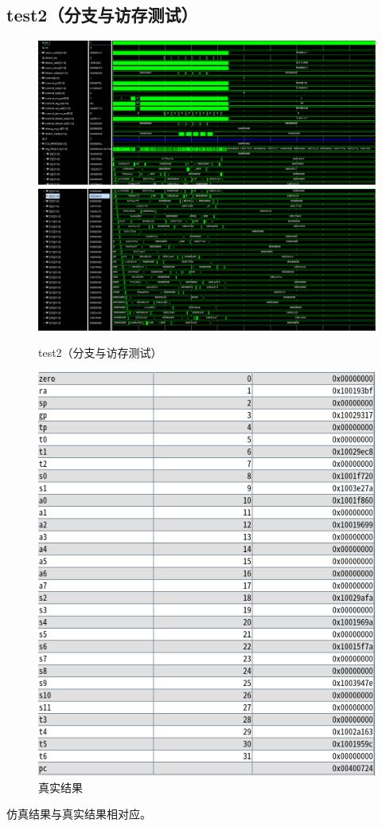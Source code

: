 \documentclass[12pt,a4paper]{ctexart}
\begin{document}
\subsection{test2（分支与访存测试）}
\begin{figure}[H]
    \centering
    \includegraphics[scale=0.35]{pic/6.png}
    \includegraphics[scale=0.35]{pic/7.png}
    \caption{test2（分支与访存测试）}
\end{figure}
\begin{figure}[H]
    \centering
    \includegraphics[scale=1]{pic/8.png}
    \caption{真实结果}
\end{figure}
仿真结果与真实结果相对应。
\end{document}
